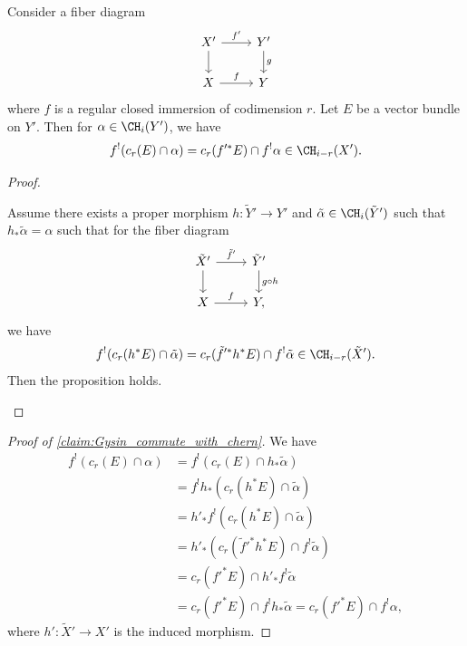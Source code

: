   \begin{proposition}
    Consider a fiber diagram
    \[ \begin{tikzcd}
      X' \ar[r, "f'"] \ar[d] & Y' \ar[d, "g"] \\
      X \ar[r, "f"] & Y
    \end{tikzcd} \]
    where $f$ is a regular closed immersion of codimension $r$.
    Let $E$ be a vector bundle on $Y'$.
    Then for $\alpha \in \CH_i(Y')$, we have
    \[  f^! (c_r(E) \cap \alpha) = c_r(f'^* E) \cap f^! \alpha \in \CH_{i-r}(X'). \]
  \end{proposition}
  \begin{proof}
    \hspace{1em}
    \begin{claim}\label{claim:Gysin_commute_with_chern}
      Assume there exists a proper morphism $h: \tilde{Y}' \to Y'$ and $\tilde{\alpha} \in \CH_i(\tilde{Y}')$ such that $h_* \tilde{\alpha} = \alpha$ such that for the fiber diagram
      \[ \begin{tikzcd}
        \tilde{X}' \ar[r, "\tilde{f}'"] \ar[d] & \tilde{Y}' \ar[d, "g \circ h"] \\
        X \ar[r, "f"] & Y,
    \end{tikzcd} \]
    we have
    \[  f^! (c_r(h^* E) \cap \tilde{\alpha}) = c_r(\tilde{f}'^* h^* E) \cap f^! \tilde{\alpha} \in \CH_{i-r}(\tilde{X}'). \]
    Then the proposition holds.
  \end{claim}
  \Yang{}
  \end{proof}

  \begin{proof}[Proof of \cref{claim:Gysin_commute_with_chern}]
    We have
    \begin{align*}
      f^! (c_r(E) \cap \alpha) & = f^! (c_r(E) \cap h_* \tilde{\alpha}) \\
      & = f^! h_* (c_r(h^* E) \cap \tilde{\alpha}) \\
      & = h'_* f^! (c_r(h^* E) \cap \tilde{\alpha}) \\
      & = h'_* (c_r(\tilde{f}'^* h^* E) \cap f^! \tilde{\alpha}) \\
      & = c_r(f'^* E) \cap h'_* f^! \tilde{\alpha} \\
      & = c_r(f'^* E) \cap f^! h_* \tilde{\alpha} = c_r(f'^* E) \cap f^! \alpha,
    \end{align*}
    where $h': \tilde{X}' \to X'$ is the induced morphism.
    \Yang{}
  \end{proof}


